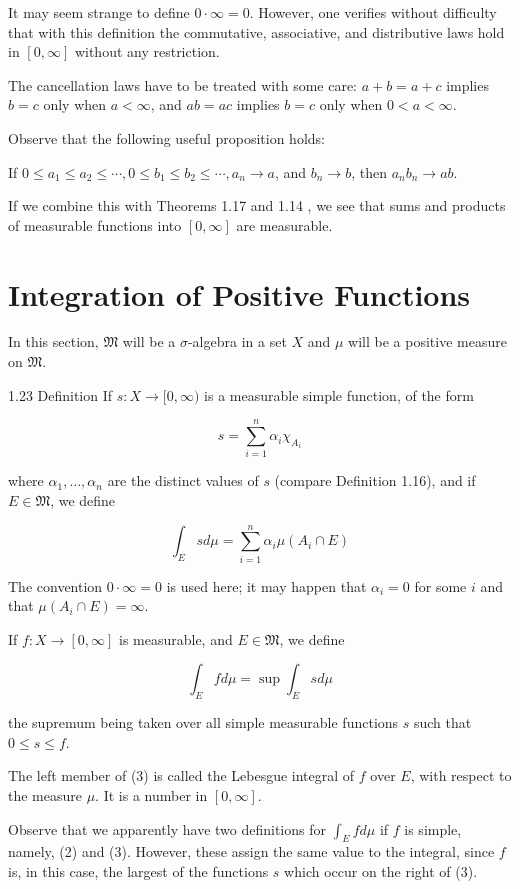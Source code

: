 \documentclass[10pt]{article}
\begin{document}
It may seem strange to define $0 \cdot \infty=0$. However, one verifies without difficulty that with this definition the commutative, associative, and distributive laws hold in $[0, \infty]$ without any restriction.

The cancellation laws have to be treated with some care: $a+b=a+c$ implies $b=c$ only when $a<\infty$, and $a b=a c$ implies $b=c$ only when $0<a<\infty$.

Observe that the following useful proposition holds:

If $0 \leq a_{1} \leq a_{2} \leq \cdots, 0 \leq b_{1} \leq b_{2} \leq \cdots, a_{n} \rightarrow a$, and $b_{n} \rightarrow b$, then $a_{n} b_{n} \rightarrow a b$.

If we combine this with Theorems 1.17 and 1.14 , we see that sums and products of measurable functions into $[0, \infty]$ are measurable.

\section{Integration of Positive Functions}
In this section, $\mathfrak{M}$ will be a $\sigma$-algebra in a set $X$ and $\mu$ will be a positive measure on $\mathfrak{M}$.

1.23 Definition If $s: X \rightarrow[0, \infty)$ is a measurable simple function, of the form

$$
s=\sum_{i=1}^{n} \alpha_{i} \chi_{A_{i}}
$$

where $\alpha_{1}, \ldots, \alpha_{n}$ are the distinct values of $s$ (compare Definition 1.16), and if $E \in \mathfrak{M}$, we define

$$
\int_{E} s d \mu=\sum_{i=1}^{n} \alpha_{i} \mu\left(A_{i} \cap E\right)
$$

The convention $0 \cdot \infty=0$ is used here; it may happen that $\alpha_{i}=0$ for some $i$ and that $\mu\left(A_{i} \cap E\right)=\infty$.

If $f: X \rightarrow[0, \infty]$ is measurable, and $E \in \mathfrak{M}$, we define

$$
\int_{E} f d \mu=\sup \int_{E} s d \mu
$$

the supremum being taken over all simple measurable functions $s$ such that $0 \leq s \leq f$.

The left member of (3) is called the Lebesgue integral of $f$ over $E$, with respect to the measure $\mu$. It is a number in $[0, \infty]$.

Observe that we apparently have two definitions for $\int_{E} f d \mu$ if $f$ is simple, namely, (2) and (3). However, these assign the same value to the integral, since $f$ is, in this case, the largest of the functions $s$ which occur on the right of (3).
\end{document}

